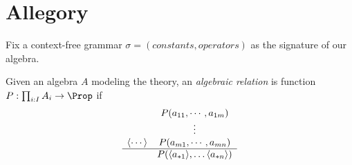 \chapter{Allegory}

Fix a context-free grammar $\sigma=(constants, operators)$ as the signature of our algebra.

Given an algebra $A$ modeling the theory,
an \emph{algebraic relation} is function $P:\prod_{i:I} A_i\to \Prop$ if 
\begin{align*}
    \begin{array}{cc}
        & P(a_{11}, \cdots, a_{1m})\\
        & \vdots \\
        \langle\cdots\rangle & P(a_{m1}, \cdots, a_{mn})\\
    \hline
       & P(\langle a_{*1}\rangle,\ldots \langle a_{*n}\rangle)
    \end{array}
\end{align*}